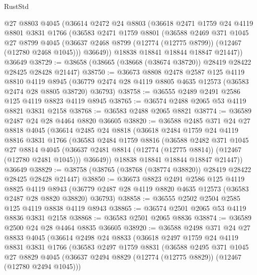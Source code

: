 \begin{lexlean}{RustStd}
\begin{coremodule}
    @27
    @8803
    @4045
    (@36614
      @2472
      @24
      @8803
      (@36618
        @2471
        @1759
        @24
        @4119
        @8801
        @3831
        @1766
        (@36583
          @2471
          @1759
          @8801
          (@36588
            @2469
            @371
            @1045
            @27
            @8799
            @4045
            (@36637 @2468 @8799 (@12774 (@12775 @8799)) (@12467 (@12780 @2468 @1045)))
            @36649))
        @18838
        @18841
        @18844
        @18847
        @21447))
    @36649
@38729 := @38658 (@38665 (@38668 (@38674 @38720)) @28419 @28422 @28425 @28428 @21447)
@38750 := @36673
    @8808
    @2478
    @2587
    @125
    @4119
    @8810
    @4119
    @8945
    (@36779 @2474 @28 @4119 @8805 @4635 @12573 (@36583 @2474 @28 @8805 @38720) @36793)
@38758 := @36555 @2489 @2491 @2586 @125 @4119 @8823 @4119 @8945
@38765 := @36574 @2488 @2065 @53 @4119 @8821 @3831 @2158
@38768 := @36583 @2488 @2065 @8821
@38774 := @36589 @2487 @24 @28 @4464 @8820 @36605
@38820 := @36588
    @2485
    @371
    @24
    @27
    @8818
    @4045
    (@36614
      @2485
      @24
      @8818
      (@36618
        @2484
        @1759
        @24
        @4119
        @8816
        @3831
        @1766
        (@36583
          @2484
          @1759
          @8816
          (@36588
            @2482
            @371
            @1045
            @27
            @8814
            @4045
            (@36637 @2481 @8814 (@12774 (@12775 @8814)) (@12467 (@12780 @2481 @1045)))
            @36649))
        @18838
        @18841
        @18844
        @18847
        @21447))
    @36649
@38829 := @38758 (@38765 (@38768 (@38774 @38820)) @28419 @28422 @28425 @28428 @21447)
@38850 := @36673
    @8823
    @2491
    @2586
    @125
    @4119
    @8825
    @4119
    @8943
    (@36779 @2487 @28 @4119 @8820 @4635 @12573 (@36583 @2487 @28 @8820 @38820) @36793)
@38858 := @36555 @2502 @2504 @2585 @125 @4119 @8838 @4119 @8943
@38865 := @36574 @2501 @2065 @53 @4119 @8836 @3831 @2158
@38868 := @36583 @2501 @2065 @8836
@38874 := @36589 @2500 @24 @28 @4464 @8835 @36605
@38920 := @36588
    @2498
    @371
    @24
    @27
    @8833
    @4045
    (@36614
      @2498
      @24
      @8833
      (@36618
        @2497
        @1759
        @24
        @4119
        @8831
        @3831
        @1766
        (@36583
          @2497
          @1759
          @8831
          (@36588
            @2495
            @371
            @1045
            @27
            @8829
            @4045
            (@36637 @2494 @8829 (@12774 (@12775 @8829)) (@12467 (@12780 @2494 @1045)))

\end{coremodule}
\end{lexlean}
